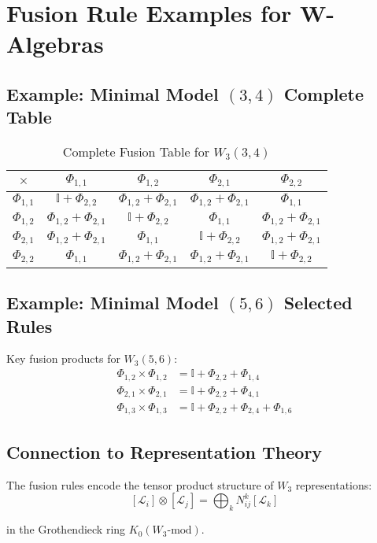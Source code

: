 
\section{Fusion Rule Examples for W-Algebras}
\label{sec:fusion-examples}

\subsection{Example: Minimal Model $(3,4)$ Complete Table}

\begin{table}[h]
\centering
\caption{Complete Fusion Table for $W_3(3,4)$}
\begin{tabular}{|c||c|c|c|c|}
\hline
$\times$ & $\Phi_{1,1}$ & $\Phi_{1,2}$ & $\Phi_{2,1}$ & $\Phi_{2,2}$ \\
\hline\hline
$\Phi_{1,1}$ & $\mathbb{I} + \Phi_{2,2}$ & $\Phi_{1,2} + \Phi_{2,1}$ & 
$\Phi_{1,2} + \Phi_{2,1}$ & $\Phi_{1,1}$ \\
\hline
$\Phi_{1,2}$ & $\Phi_{1,2} + \Phi_{2,1}$ & $\mathbb{I} + \Phi_{2,2}$ & 
$\Phi_{1,1}$ & $\Phi_{1,2} + \Phi_{2,1}$ \\
\hline
$\Phi_{2,1}$ & $\Phi_{1,2} + \Phi_{2,1}$ & $\Phi_{1,1}$ & 
$\mathbb{I} + \Phi_{2,2}$ & $\Phi_{1,2} + \Phi_{2,1}$ \\
\hline
$\Phi_{2,2}$ & $\Phi_{1,1}$ & $\Phi_{1,2} + \Phi_{2,1}$ & 
$\Phi_{1,2} + \Phi_{2,1}$ & $\mathbb{I} + \Phi_{2,2}$ \\
\hline
\end{tabular}
\end{table}

\subsection{Example: Minimal Model $(5,6)$ Selected Rules}

Key fusion products for $W_3(5,6)$:
\begin{align}
\Phi_{1,2} \times \Phi_{1,2} &= \mathbb{I} + \Phi_{2,2} + \Phi_{1,4} \\
\Phi_{2,1} \times \Phi_{2,1} &= \mathbb{I} + \Phi_{2,2} + \Phi_{4,1} \\
\Phi_{1,3} \times \Phi_{1,3} &= \mathbb{I} + \Phi_{2,2} + \Phi_{2,4} + \Phi_{1,6}
\end{align}

\subsection{Connection to Representation Theory}

The fusion rules encode the tensor product structure of $W_3$ representations:
$$[\mathcal{L}_i] \otimes [\mathcal{L}_j] = \bigoplus_k N_{ij}^k [\mathcal{L}_k]$$

in the Grothendieck ring $K_0(W_3\text{-mod})$.

